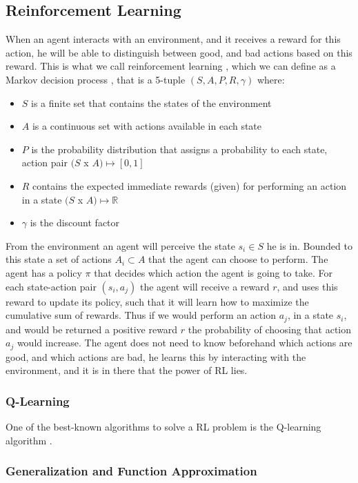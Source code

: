 \documentclass[a4paper,12pt]{article}
\begin{document}
\subsection{Reinforcement Learning}
When an agent interacts with an environment, and it receives a reward for this action, he will be able to distinguish between good, and bad actions based on this reward. This is what we call reinforcement learning \cite{sutton1998rl}, which we can define as a Markov decision process \cite{howard1960mdp}, that is a 5-tuple $(S, A, P, R, \gamma)$ where:
\begin{itemize}
\item $S$ is a finite set that contains the states of the environment
\item $A$ is a continuous set with actions available in each state
\item $P$ is the probability distribution that assigns a probability to each state, action pair $(S$ x $A) \mapsto [0,1]$
\item $R$ contains the expected immediate rewards (given) for performing an action in a state $(S$ x $A) \mapsto \mathbb{R}$
\item $\gamma$ is the discount factor
\end{itemize}
From the environment an agent will perceive the state $s_{i} \in S$ he is in. Bounded to this state a set of actions $A_{i} \subset A$ that the agent can choose to perform. The agent has a policy $\pi$ that decides which action the agent is going to take. For each state-action pair $(s_{i}, a_{j})$ the agent will receive a reward $r$, and uses this reward to update its policy, such that it will learn how to maximize the cumulative sum of rewards. Thus if we would perform an action $a_{j}$, in a state $s_{i}$, and would be returned a positive reward $r$ the probability of choosing that action $a_{j}$ would increase. The agent does not need to know beforehand which actions are good, and which actions are bad, he learns this by interacting with the environment, and it is in there that the power of RL lies.
\subsubsection{Q-Learning}
One of the best-known algorithms to solve a RL problem is the Q-learning algorithm \cite{sutton1998rl}.
\subsubsection{Generalization and Function Approximation}
\end{document}
